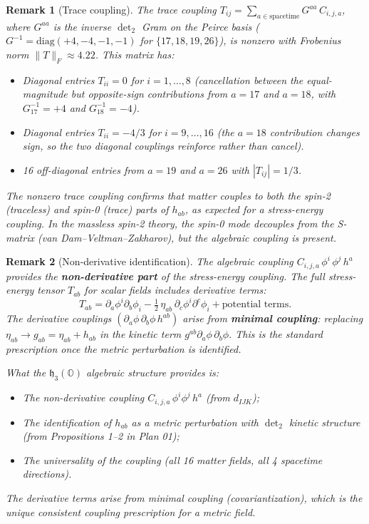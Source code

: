 \documentclass[11pt]{article}
\newtheorem{remark}{Remark}
\newcommand{\h}{\mathfrak{h}}
\begin{document}
\begin{remark}[Trace coupling]\label{rem:trace}
The trace coupling $T_{ij} = \sum_{a \in \mathrm{spacetime}} G^{aa}\,C_{i,j,a}$,
where $G^{aa}$ is the inverse $\det_2$ Gram on the Peirce basis
($G^{-1} = \mathrm{diag}(+4, -4, -1, -1)$ for $\{17,18,19,26\}$),
is nonzero with Frobenius norm $\|T\|_F \approx 4.22$.
This matrix has:
\begin{itemize}
\item Diagonal entries $T_{ii} = 0$ for $i = 1,\ldots,8$ (cancellation
  between the equal-magnitude but opposite-sign contributions from
  $a = 17$ and $a = 18$, with $G^{-1}_{17} = +4$ and $G^{-1}_{18} = -4$).
\item Diagonal entries $T_{ii} = -4/3$ for $i = 9,\ldots,16$
  (the $a = 18$ contribution changes sign, so the two diagonal
  couplings reinforce rather than cancel).
\item 16 off-diagonal entries from $a = 19$ and $a = 26$ with
  $|T_{ij}| = 1/3$.
\end{itemize}
The nonzero trace coupling confirms that matter couples to both
the spin-2 (traceless) and spin-0 (trace) parts of $h_{ab}$,
as expected for a stress-energy coupling. In the massless spin-2
theory, the spin-0 mode decouples from the S-matrix
(van Dam--Veltman--Zakharov), but the algebraic coupling is present.
\end{remark}

\begin{remark}[Non-derivative identification]\label{rem:nonderivative}
The algebraic coupling $C_{i,j,a}\,\phi^i\,\phi^j\,h^a$ provides the
\textbf{non-derivative part} of the stress-energy coupling.
The full stress-energy tensor $T_{ab}$ for scalar fields includes
derivative terms:
\[
  T_{ab} = \partial_a \phi^i \partial_b \phi_i
    - \tfrac{1}{2}\,\eta_{ab}\,\partial_c \phi^i \partial^c \phi_i
    + \text{potential terms}.
\]
The derivative couplings $({\partial_a \phi}\,{\partial_b \phi}\,h^{ab})$
arise from \textbf{minimal coupling}: replacing $\eta_{ab} \to g_{ab} = \eta_{ab} + h_{ab}$
in the kinetic term $g^{ab}\partial_a\phi\,\partial_b\phi$.
This is the standard prescription once the metric perturbation is identified.

What the $\h_3(\mathbb{O})$ algebraic structure provides is:
\begin{itemize}
\item The non-derivative coupling $C_{i,j,a}\,\phi^i\phi^j\,h^a$ (from $d_{IJK}$);
\item The identification of $h_{ab}$ as a metric perturbation
  with $\det_2$ kinetic structure (from Propositions 1--2 in Plan 01);
\item The universality of the coupling (all 16 matter fields, all 4
  spacetime directions).
\end{itemize}
The derivative terms arise from minimal coupling (covariantization),
which is the unique consistent coupling prescription for a metric field.
\end{remark}
\end{document}
